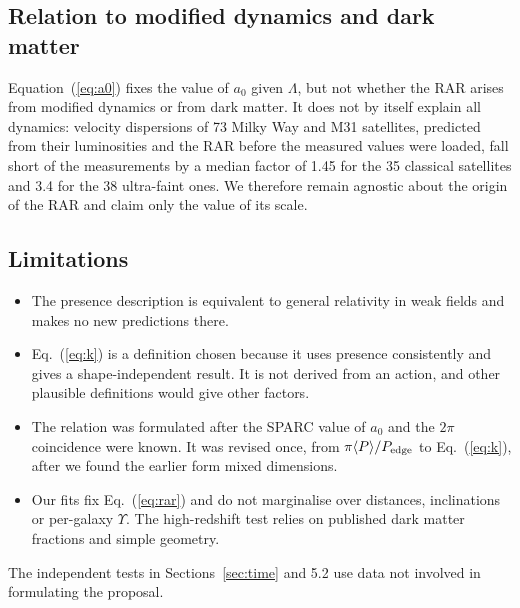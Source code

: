 \documentclass[11pt]{article}
\begin{document}
\subsection{Relation to modified dynamics and dark matter}
Equation~(\ref{eq:a0}) fixes the value of $a_0$ given $\Lambda$, but not whether the RAR arises from modified dynamics or from dark matter. It does not by itself explain all dynamics: velocity dispersions of 73 Milky Way and M31 satellites, predicted from their luminosities and the RAR before the measured values were loaded, fall short of the measurements by a median factor of 1.45 for the 35 classical satellites and 3.4 for the 38 ultra-faint ones. We therefore remain agnostic about the origin of the RAR and claim only the value of its scale.

\subsection{Limitations}
\begin{itemize}
\item The presence description is equivalent to general relativity in weak fields and makes no new predictions there.
\item Eq.~(\ref{eq:k}) is a definition chosen because it uses presence consistently and gives a shape-independent result. It is not derived from an action, and other plausible definitions would give other factors.
\item The relation was formulated after the SPARC value of $a_0$ and the $2\pi$ coincidence were known. It was revised once, from $\pi\langle P\rangle/P_{\rm edge}$ to Eq.~(\ref{eq:k}), after we found the earlier form mixed dimensions.
\item Our fits fix Eq.~(\ref{eq:rar}) and do not marginalise over distances, inclinations or per-galaxy $\Upsilon$. The high-redshift test relies on published dark matter fractions and simple geometry.
\end{itemize}
The independent tests in Sections~\ref{sec:time} and 5.2 use data not involved in formulating the proposal.
\end{document}
